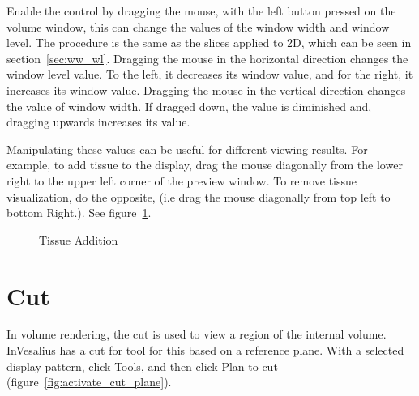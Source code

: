 Enable the control by dragging the mouse, with the left button pressed on the volume window, this can change the values of the window width and window level. The procedure is the same as the slices applied to 2D, which can be seen in section~\ref{sec:ww_wl}. Dragging the mouse in the horizontal direction changes  the window level value. To the left, it decreases its window value, and for the right, it increases its window value. Dragging the mouse in the vertical direction changes the value of window width. If dragged down, the value is diminished and, dragging upwards increases its value.


Manipulating these values can be useful for different viewing results. For example, to add tissue to the display, drag the mouse diagonally from the lower right to the upper left corner of the preview window. To remove tissue visualization, do the opposite, (i.e drag the mouse diagonally from top left to bottom Right.). See figure~\ref{fig:raycasting_add}.

\begin{figure}[!htb]
  \centering
  \hfill
  \hfill  
  \caption{Tissue Addition}
  \label{fig:raycasting_add}
\end{figure}

\newpage


\section{Cut}

In volume rendering, the cut is used to view a region of the internal volume. InVesalius has a cut for tool for this based on a reference plane. With a selected display pattern, click Tools, and then click Plan to cut (figure~\ref{fig:activate_cut_plane}).

